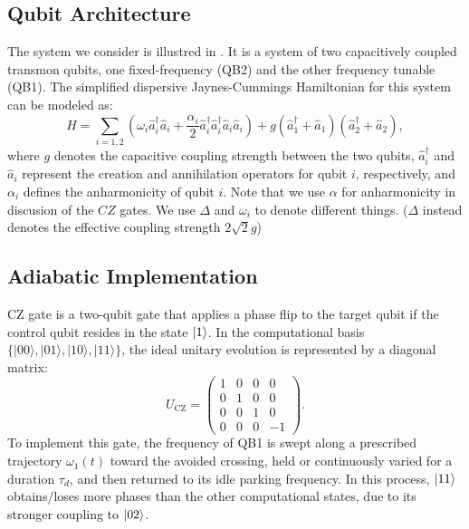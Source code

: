\subsection{Qubit Architecture}
The system we consider is illustred in .
It is a system of two capacitively coupled transmon qubits, one fixed-frequency (QB2) and the other frequency tunable (QB1).
The simplified dispersive Jaynes-Cummings Hamiltonian for this system can be modeled as:
\begin{equation}
  H = \sum_{i=1,2} \left( \omega_i \hat{a}_i^\dagger \hat{a}_i + \frac{\alpha_i}{2} \hat{a}_i^\dagger \hat{a}_i^\dagger \hat{a}_i \hat{a}_i \right) + g(\hat{a}_1^\dagger + \hat{a}_1)(\hat{a}_2^\dagger + \hat{a}_2) ,
  \label{eq:hamiltonian_cz}
\end{equation}
where $g$ denotes the capacitive coupling strength between the two qubits, $\hat{a}_i^\dagger$ and $\hat{a}_i$ represent the
creation and annihilation operators for qubit $i$, respectively, and $\alpha_i$ defines the anharmonicity of qubit $i$.
Note that we use $\alpha$ for anharmonicity in discusion of the $CZ$ gates.
We use $\Delta$ and $\omega_i$ to denote different things. ($\Delta$ instead denotes the effective coupling strength
$2\sqrt{2}g$)
\subsection{Adiabatic Implementation}
CZ gate is a two-qubit gate that applies a phase flip to the target qubit if the control qubit resides in the state
$\ket{1}$. In the computational basis $\{\vert{}00\rangle, \vert{}01\rangle, \vert{}10\rangle, \vert{}11\rangle\}$, the
ideal unitary evolution is represented by a diagonal matrix:
\begin{equation}
  U_{\mathrm{CZ}}=\begin{pmatrix}
    1 & 0 & 0 & 0  \\
    0 & 1 & 0 & 0  \\
    0 & 0 & 1 & 0  \\
    0 & 0 & 0 & -1
  \end{pmatrix}.
\end{equation}
To implement this gate, the frequency of QB1 is swept along a
prescribed trajectory $\omega_1(t)$ toward the avoided crossing, held or continuously varied for a duration $\tau_d$,
and then returned to its idle parking frequency.
In this process, $\ket{11}$ obtains/loses more phases than the other computational states, due to its stronger coupling
to $\ket{02}$.

